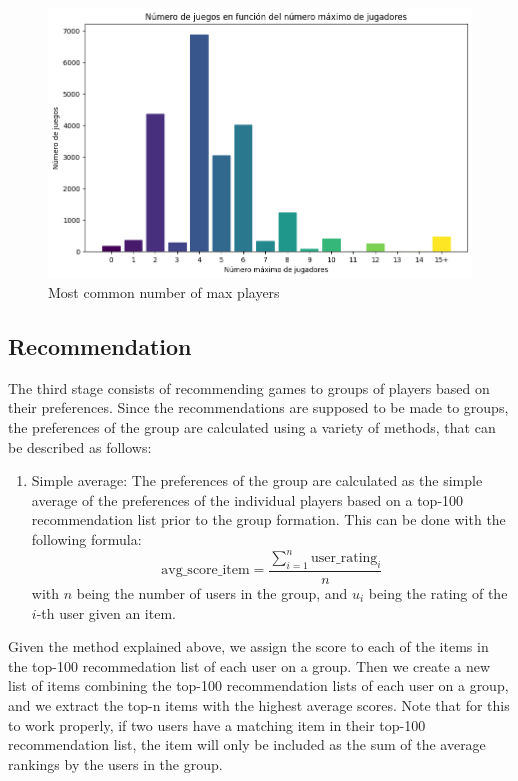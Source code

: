 \documentclass{article}
\begin{document}
\begin{figure}[h]
    \centering
    \includegraphics[width=0.9\linewidth]{output.png}
    \caption{Most common number of max players}
    \label{fig:output}
\end{figure}

\subsection{Recommendation}
The third stage consists of recommending games to groups of players based on their preferences. Since the recommendations are supposed to be made to groups, the preferences of the group are calculated using a variety of methods, that can be described as follows:
\begin{enumerate}
    \item Simple average: The preferences of the group are calculated as the simple average of the preferences of the individual players based on a top-100 recommendation list prior to the group formation. This can be done with the following formula:
          \begin{equation}
              \text{avg\_score\_item} = \frac{\sum_{i=1}^{n} \text{user\_rating}_i}{n}
          \end{equation}
          with $n$ being the number of users in the group, and $u_i$ being the rating of the $i$-th user given an item.
\end{enumerate}

Given the method explained above, we assign the score to each of the items in the top-100 recommedation list of each user on a group. Then we create a new list of items combining the top-100 recommendation lists of each user on a group, and we extract the top-n items with the highest average scores. Note that for this to work properly, if two users have a matching item in their top-100 recommendation list, the item will only be included as the sum of the average rankings by the users in the group.
\end{document}
